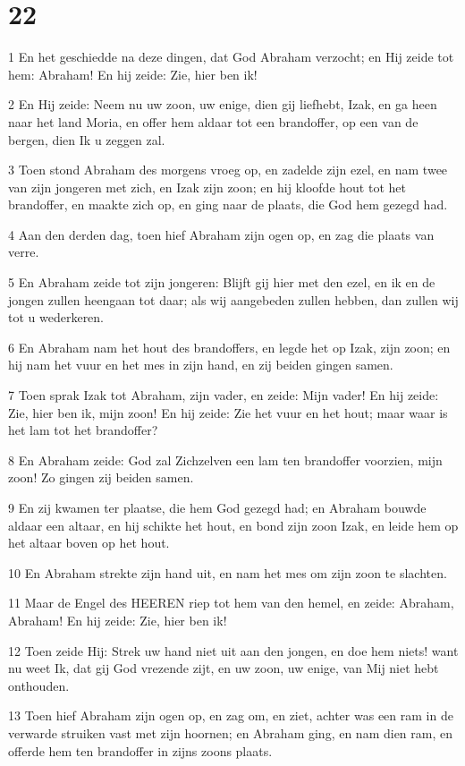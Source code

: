 \chapter{22}

\par 1 En het geschiedde na deze dingen, dat God Abraham verzocht; en Hij zeide tot hem: Abraham! En hij zeide: Zie, hier ben ik!
\par 2 En Hij zeide: Neem nu uw zoon, uw enige, dien gij liefhebt, Izak, en ga heen naar het land Moria, en offer hem aldaar tot een brandoffer, op een van de bergen, dien Ik u zeggen zal.
\par 3 Toen stond Abraham des morgens vroeg op, en zadelde zijn ezel, en nam twee van zijn jongeren met zich, en Izak zijn zoon; en hij kloofde hout tot het brandoffer, en maakte zich op, en ging naar de plaats, die God hem gezegd had.
\par 4 Aan den derden dag, toen hief Abraham zijn ogen op, en zag die plaats van verre.
\par 5 En Abraham zeide tot zijn jongeren: Blijft gij hier met den ezel, en ik en de jongen zullen heengaan tot daar; als wij aangebeden zullen hebben, dan zullen wij tot u wederkeren.
\par 6 En Abraham nam het hout des brandoffers, en legde het op Izak, zijn zoon; en hij nam het vuur en het mes in zijn hand, en zij beiden gingen samen.
\par 7 Toen sprak Izak tot Abraham, zijn vader, en zeide: Mijn vader! En hij zeide: Zie, hier ben ik, mijn zoon! En hij zeide: Zie het vuur en het hout; maar waar is het lam tot het brandoffer?
\par 8 En Abraham zeide: God zal Zichzelven een lam ten brandoffer voorzien, mijn zoon! Zo gingen zij beiden samen.
\par 9 En zij kwamen ter plaatse, die hem God gezegd had; en Abraham bouwde aldaar een altaar, en hij schikte het hout, en bond zijn zoon Izak, en leide hem op het altaar boven op het hout.
\par 10 En Abraham strekte zijn hand uit, en nam het mes om zijn zoon te slachten.
\par 11 Maar de Engel des HEEREN riep tot hem van den hemel, en zeide: Abraham, Abraham! En hij zeide: Zie, hier ben ik!
\par 12 Toen zeide Hij: Strek uw hand niet uit aan den jongen, en doe hem niets! want nu weet Ik, dat gij God vrezende zijt, en uw zoon, uw enige, van Mij niet hebt onthouden.
\par 13 Toen hief Abraham zijn ogen op, en zag om, en ziet, achter was een ram in de verwarde struiken vast met zijn hoornen; en Abraham ging, en nam dien ram, en offerde hem ten brandoffer in zijns zoons plaats.

